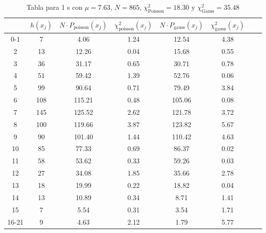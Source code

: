 \begin{center}
\begin{table}[H]
\caption{Tabla para 1 s con $\mu=7.63$, $N=865$, $\chi^2_{\text{Poisson}}=18.30$  y $\chi^2_{\text{Gauss}}=35.48$}
\label{Tab:histo_manual_1s}
\begin{tabular}{cccccccc}
\toprule
 & $h(x_j)$ & $N \cdot P_{\text{poisson}} (x_j)$ & $\chi^2_{\text{poisson}}(x_j)$ & $N \cdot P_{\text{gauss}} (x_j)$ & $\chi^2_{\text{gauss}}(x_j)$ \\
\midrule
0-1 & \num{    7} & \num{4.06} & \num{1.24} & \num{12.54} & \num{4.38} \\
2 & \num{   13} & \num{12.26} & \num{0.04} & \num{15.68} & \num{0.55} \\
3 & \num{   36} & \num{31.17} & \num{0.65} & \num{30.71} & \num{0.78} \\
4 & \num{   51} & \num{59.42} & \num{1.39} & \num{52.76} & \num{0.06} \\
5 & \num{   99} & \num{90.64} & \num{0.71} & \num{79.49} & \num{3.84} \\
6 & \num{  108} & \num{115.21} & \num{0.48} & \num{105.06} & \num{0.08} \\
7 & \num{  145} & \num{125.52} & \num{2.62} & \num{121.78} & \num{3.72} \\
8 & \num{  100} & \num{119.66} & \num{3.87} & \num{123.82} & \num{5.67} \\
9 & \num{   90} & \num{101.40} & \num{1.44} & \num{110.42} & \num{4.63} \\
10 & \num{   85} & \num{77.33} & \num{0.69} & \num{86.37} & \num{0.02} \\
11 & \num{   58} & \num{53.62} & \num{0.33} & \num{59.26} & \num{0.03} \\
12 & \num{   27} & \num{34.08} & \num{1.85} & \num{35.66} & \num{2.78} \\
13 & \num{   18} & \num{19.99} & \num{0.22} & \num{18.82} & \num{0.04} \\
14 & \num{   13} & \num{10.89} & \num{0.34} & \num{8.71} & \num{1.41} \\
15 & \num{    7} & \num{5.54} & \num{0.31} & \num{3.54} & \num{1.71} \\
16-21 & \num{    9} & \num{4.63} & \num{2.12} & \num{1.79} & \num{5.77} \\
\bottomrule
\end{tabular}
\end{table}
\end{center}
